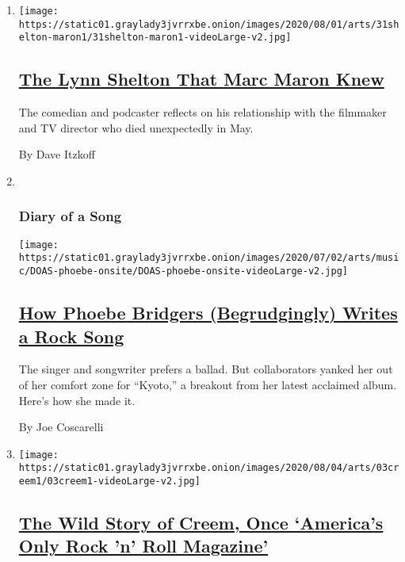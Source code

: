 \begin{enumerate}
\def\labelenumi{\arabic{enumi}.}
\item
  \texttt{[image: https://static01.graylady3jvrrxbe.onion/images/2020/08/01/arts/31shelton-maron1/31shelton-maron1-videoLarge-v2.jpg]}

  \hypertarget{the-lynn-shelton-that-marc-maron-knew}{%
  \subsection{\texorpdfstring{\href{/2020/07/31/movies/marc-maron-lynn-shelton.html}{The
  Lynn Shelton That Marc Maron
  Knew}}{The Lynn Shelton That Marc Maron Knew}}\label{the-lynn-shelton-that-marc-maron-knew}}

  The comedian and podcaster reflects on his relationship with the
  filmmaker and TV director who died unexpectedly in May.

  By Dave Itzkoff
\item ~
  \hypertarget{diary-of-a-song}{%
  \subsubsection{Diary of a Song}\label{diary-of-a-song}}

  \texttt{[image: https://static01.graylady3jvrrxbe.onion/images/2020/07/02/arts/music/DOAS-phoebe-onsite/DOAS-phoebe-onsite-videoLarge-v2.jpg]}

  \hypertarget{how-phoebe-bridgers-begrudgingly-writes-a-rock-song}{%
  \subsection{\texorpdfstring{\href{/2020/07/30/arts/music/phoebe-bridgers-kyoto.html}{How
  Phoebe Bridgers (Begrudgingly) Writes a Rock
  Song}}{How Phoebe Bridgers (Begrudgingly) Writes a Rock Song}}\label{how-phoebe-bridgers-begrudgingly-writes-a-rock-song}}

  The singer and songwriter prefers a ballad. But collaborators yanked
  her out of her comfort zone for ``Kyoto,'' a breakout from her latest
  acclaimed album. Here's how she made it.

  By Joe Coscarelli
\item
  \texttt{[image: https://static01.graylady3jvrrxbe.onion/images/2020/08/04/arts/03creem1/03creem1-videoLarge-v2.jpg]}

  \hypertarget{the-wild-story-of-creem-once-americas-only-rock-n-roll-magazine}{%
  \subsection{\texorpdfstring{\href{/2020/08/03/arts/music/creem-magazine-documentary.html}{The
  Wild Story of Creem, Once `America's Only Rock 'n' Roll
  Magazine'}}{The Wild Story of Creem, Once `America's Only Rock 'n' Roll Magazine'}}\label{the-wild-story-of-creem-once-americas-only-rock-n-roll-magazine}}


\end{enumerate}
